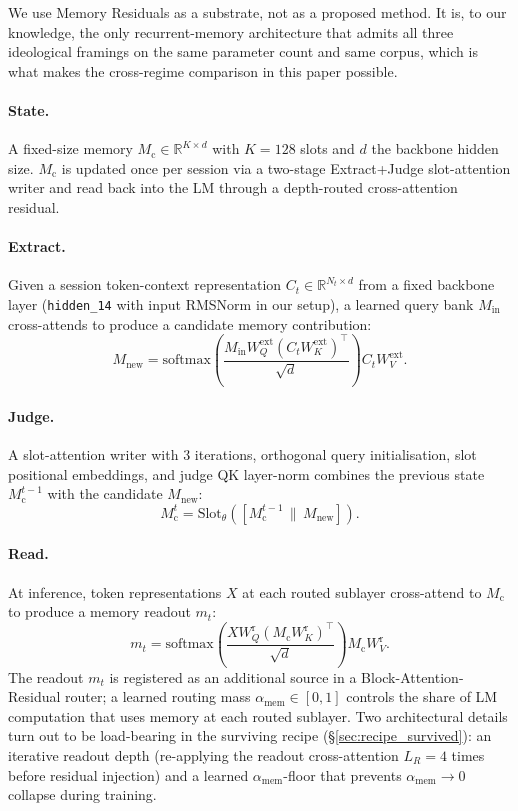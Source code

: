 \documentclass{article}
\newcommand{\Mc}{M_{\mathrm{c}}}
\newcommand{\Ct}{C_t}
\newcommand{\mt}{m_t}
\newcommand{\Min}{M_{\mathrm{in}}}
\newcommand{\Mnew}{M_{\mathrm{new}}}
\newcommand{\amem}{\alpha_{\mathrm{mem}}}
\begin{document}
We use Memory Residuals as a substrate, not as a proposed method.
It is, to our knowledge, the only recurrent-memory architecture
that admits all three ideological framings on the same parameter
count and same corpus, which is what makes the cross-regime
comparison in this paper possible.

\paragraph{State.}  A fixed-size memory $\Mc \in \mathbb{R}^{K \times d}$
with $K=128$ slots and $d$ the backbone hidden size.  $\Mc$ is updated
once per session via a two-stage Extract+Judge slot-attention writer
and read back into the LM through a depth-routed cross-attention
residual.

\paragraph{Extract.}  Given a session token-context representation
$\Ct \in \mathbb{R}^{N_t \times d}$ from a fixed backbone layer
(\texttt{hidden\_14} with input RMSNorm in our setup), a learned
query bank $\Min$ cross-attends to produce a candidate memory
contribution:
\begin{equation}
\Mnew = \mathrm{softmax}\!\left(\frac{\Min W_Q^{\mathrm{ext}}(\Ct W_K^{\mathrm{ext}})^\top}{\sqrt d}\right)\Ct W_V^{\mathrm{ext}}.
\label{eq:extract}
\end{equation}

\paragraph{Judge.}  A slot-attention writer with $3$ iterations,
orthogonal query initialisation, slot positional embeddings, and
judge QK layer-norm combines the previous state $\Mc^{t-1}$ with the
candidate $\Mnew$:
\begin{equation}
\Mc^{t} = \mathrm{Slot}_{\theta}\!\left([\Mc^{t-1} \,\|\, \Mnew]\right).
\label{eq:judge}
\end{equation}

\paragraph{Read.}  At inference, token representations $X$ at each
routed sublayer cross-attend to $\Mc$ to produce a memory readout
$\mt$:
\begin{equation}
\mt = \mathrm{softmax}\!\left(\frac{X W_Q^{\mathrm{r}}(\Mc W_K^{\mathrm{r}})^\top}{\sqrt d}\right)\Mc W_V^{\mathrm{r}}.
\label{eq:read}
\end{equation}
The readout $\mt$ is registered as an additional source in a
Block-Attention-Residual router; a learned routing mass
$\amem \in [0,1]$ controls the share of LM computation that uses
memory at each routed sublayer.  Two architectural details turn out
to be load-bearing in the surviving recipe (\S\ref{sec:recipe_survived}):
an iterative readout depth (re-applying the readout cross-attention
$L_R{=}4$ times before residual injection) and a learned $\amem$-floor
that prevents $\amem \to 0$ collapse during training.
\end{document}
